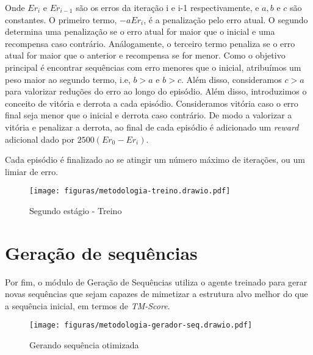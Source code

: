 \noindent
Onde $Er_{i}$ e $Er_{i-1}$ são os erros da iteração i e i-1 respectivamente, e $a, b$ e $c$ são constantes. O primeiro termo, $-aEr_{i}$, é a penalização pelo erro atual. O segundo determina uma penalização se o erro atual for maior que o inicial e uma recompensa caso contrário. Análogamente, o terceiro termo penaliza se o erro atual for maior que o anterior e recompensa se for menor. Como o objetivo principal é encontrar sequências com erro menores que o inicial, atribuímos um peso maior ao segundo termo, i.e, $b>a$ e $b>c$. Além disso, consideramos $c>a$ para valorizar reduções do erro ao longo do episódio.  
Além disso, introduzimos o conceito de vitória e derrota a cada episódio. Consideramos vitória caso o erro final seja menor que o inicial e derrota caso contrário. De modo a valorizar a vitória e penalizar a derrota, ao final de cada episódio é adicionado um \textit{reward} adicional dado por $2500(Er_{0} - Er_{i})$. 

Cada episódio é finalizado ao se atingir um número máximo de iterações, ou um limiar de erro. 

\begin{figure}[H]
  \centering
  \texttt{[image: figuras/metodologia-treino.drawio.pdf]}
  \caption{Segundo estágio - Treino}
\end{figure}

\section{Geração de sequências}
Por fim, o módulo de Geração de Sequências utiliza o agente treinado para gerar novas sequências que sejam capazes de mimetizar a estrutura alvo melhor do que a sequência inicial, em termos de \textit{TM-Score}.  
\begin{figure}[H]
  \centering
  \texttt{[image: figuras/metodologia-gerador-seq.drawio.pdf]}
  \caption{Gerando sequência otimizada}
\end{figure}
